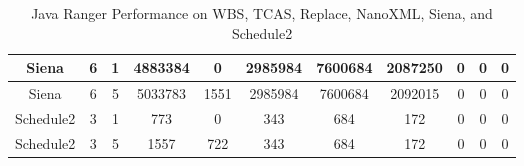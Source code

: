 \begin{table*}[]
\begin{tabular}{@{}ccccccccccc@{}}
        Siena                                                    & 6                                                          & 1    & 4883384                                                     & 0                                                                         & 2985984                                                 & 7600684                                                    & 2087250                                                        & 0                                                         & 0                                                         & 0       \\ \midrule
        Siena                                                    & 6                                                          & 5    & 5033783                                                     & 1551                                                                      & 2985984                                                 & 7600684                                                    & 2092015                                                        & 0                                                         & 0                                                         & 0       \\ \midrule
        Schedule2                                                & 3                                                          & 1    & 773                                                         & 0                                                                         & 343                                                     & 684                                                        & 172                                                            & 0                                                         & 0                                                         & 0       \\ \midrule
        Schedule2                                                & 3                                                          & 5    & 1557                                                        & 722                                                                       & 343                                                     & 684                                                        & 172                                                            & 0                                                         & 0                                                         & 0       \\ \bottomrule
    \end{tabular}
    \caption{Java Ranger Performance on WBS, TCAS, Replace, NanoXML, Siena, and Schedule2}
    \label{table:results1}
\end{table*}

